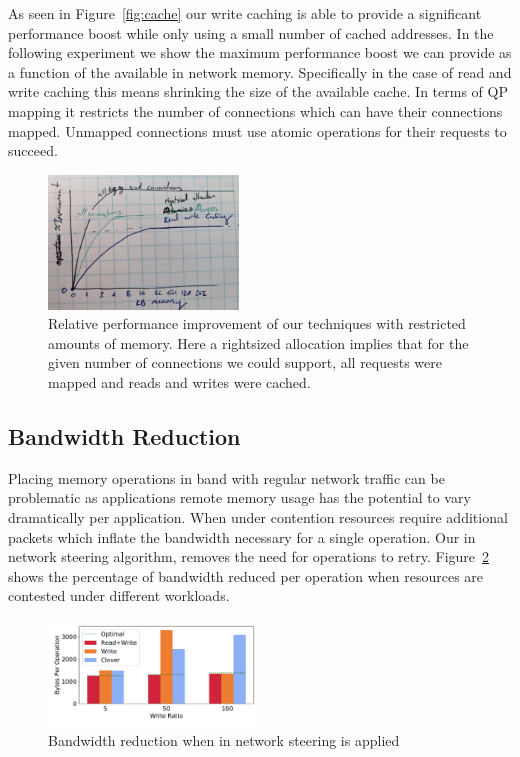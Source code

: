 As seen in Figure~\ref{fig:cache} our write caching is able to provide a
significant performance boost while only using a small number of cached
addresses. In the following experiment we show the maximum performance boost we
can provide as a function of the available in network memory. Specifically in
the case of read and write caching this means shrinking the size of the
available cache. In terms of QP mapping it restricts the number of connections
which can have their connections mapped. Unmapped connections must use atomic
operations for their requests to succeed.

\begin{figure}
    \includegraphics[width=0.45\textwidth]{fig/memory_util.jpg}
    \caption{{Relative performance improvement of our techniques with restricted amounts of memory. Here a rightsized allocation implies that for the given number of connections we could support, all requests were mapped and reads and writes were cached.}}
    \label{fig:memory_util}
\end{figure}



\subsection{Bandwidth Reduction}

Placing memory operations in band with regular network traffic can be
problematic as applications remote memory usage has the potential to vary
dramatically per application. When under contention resources require additional
packets which inflate the bandwidth necessary for a single operation. Our in
network steering algorithm, removes the need for operations to retry.
Figure~\ref{fig:bandwidth_reduction} shows the percentage of bandwidth reduced
per operation when resources are contested under different workloads.

\begin{figure}
    \includegraphics[width=0.5\textwidth]{fig/bandwidth_reduction.pdf}
    \caption{{Bandwidth reduction when in network steering is applied}}
    \label{fig:bandwidth_reduction}
\end{figure}

